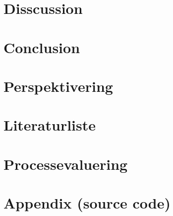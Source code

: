 \documentclass[a4paper,10pt]{article}
\begin{document}
\newpage

\section{Disscussion} 


\newpage

\section{Conclusion} 


\newpage

\section{Perspektivering} 


\newpage

\section{Literaturliste} 


\newpage

\section{Processevaluering} 


\newpage

\section{Appendix (source code)}
\end{document}
